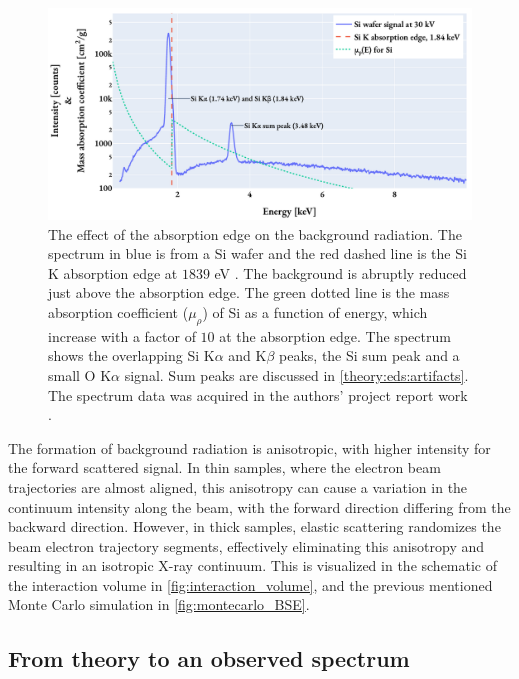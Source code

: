 \begin{figure}[pht]
    \centering
    \includegraphics[width=0.95\linewidth]{figures/background_absorptionEdge_Si.pdf}
    \caption{
        The effect of the absorption edge on the background radiation.
        The spectrum in blue is from a Si wafer and the red dashed line is the Si K absorption edge at $1839$ eV \cite{absorptionEdges_1967,hyperspy_1.7.1}.
        The background is abruptly reduced just above the absorption edge.
        The green dotted line is the mass absorption coefficient ($\mu_\rho$) of Si as a function of energy, which increase with a factor of $10$ at the absorption edge.
        The spectrum shows the overlapping Si K$\alpha$ and K$\beta$ peaks, the Si sum peak and a small O K$\alpha$ signal.
        Sum peaks are discussed in \cref{theory:eds:artifacts}.
        The spectrum data was acquired in the authors' project report work \cite{project_report}.
    }
    \label{fig:background_absorptionEdgeSi}
\end{figure}




The formation of background radiation is anisotropic, with higher intensity for the forward scattered signal.
In thin samples, where the electron beam trajectories are almost aligned, this anisotropy can cause a variation in the continuum intensity along the beam, with the forward direction differing from the backward direction.
However, in thick samples, elastic scattering randomizes the beam electron trajectory segments, effectively eliminating this anisotropy and resulting in an isotropic X-ray continuum.
This is visualized in the schematic of the interaction volume in \cref{fig:interaction_volume}, and the previous mentioned Monte Carlo simulation in \cref{fig:montecarlo_BSE}.



\subsection{From theory to an observed spectrum}
\label{theory:eds:fromtheorytoreal}

